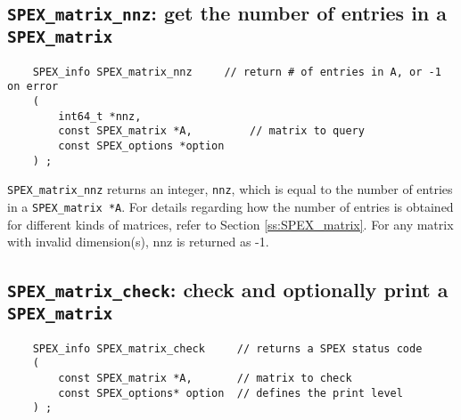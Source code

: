 \documentclass[12pt]{report}
\theoremstyle{definition}
\begin{document}
\subsection{\texttt{SPEX\_matrix\_nnz}: get the number of entries in a \texttt{SPEX\_matrix}}
\label{s:user:matrix_nnz}

\begin{mdframed}[userdefinedwidth=6in]
{\footnotesize
\begin{verbatim}
    SPEX_info SPEX_matrix_nnz     // return # of entries in A, or -1 on error
    (
        int64_t *nnz,
        const SPEX_matrix *A,         // matrix to query
        const SPEX_options *option
    ) ;
\end{verbatim}
} \end{mdframed}

\verb|SPEX_matrix_nnz| returns an integer, \verb|nnz|, which is equal to the number of entries in a \verb|SPEX_matrix *A|.
For details regarding how the number of entries is obtained for different kinds
of matrices, refer to Section \ref{ss:SPEX_matrix}.
For any matrix with invalid dimension(s), nnz is returned as -1.

\subsection{\texttt{SPEX\_matrix\_check}: check and optionally print a \texttt{SPEX\_matrix}}
\label{s:user:matrix_check}

\begin{mdframed}[userdefinedwidth=6in]
{\footnotesize
\begin{verbatim}
    SPEX_info SPEX_matrix_check     // returns a SPEX status code
    (
        const SPEX_matrix *A,       // matrix to check
        const SPEX_options* option  // defines the print level
    ) ;
\end{verbatim}
} \end{mdframed}
\end{document}
